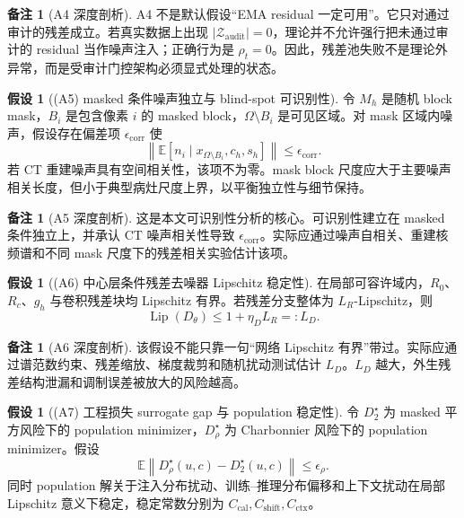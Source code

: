 \documentclass[11pt,a4paper,UTF8,fontset=fandol]{ctexart}
\theoremstyle{definition}
\newtheorem{assumption}[theorem]{假设}
\newtheorem{remark}[theorem]{备注}
\DeclareMathOperator{\Lip}{Lip}
\newcommand{\norm}[1]{\left\lVert#1\right\rVert}
\newcommand{\E}{\mathbb{E}}
\newcommand{\cZ}{\mathcal{Z}}
\begin{document}
\begin{remark}[A4 深度剖析]
A4 不是默认假设“EMA residual 一定可用”。它只对通过审计的残差成立。若真实数据上出现 $|\cZ_{\mathrm{audit}}|=0$，理论并不允许强行把未通过审计的 residual 当作噪声注入；正确行为是 $\rho_t=0$。因此，残差池失败不是理论外异常，而是受审计门控架构必须显式处理的状态。
\end{remark}

\begin{assumption}[(A5) masked 条件噪声独立与 blind-spot 可识别性]
令 $M_h$ 是随机 block mask，$B_i$ 是包含像素 $i$ 的 masked block，$\Omega\setminus B_i$ 是可见区域。对 mask 区域内噪声，假设存在偏差项 $\epsilon_{\mathrm{corr}}$ 使
\begin{equation}
\label{eq:masked-independence-coreA}
    \left\|
    \E[n_i\mid x_{\Omega\setminus B_i},c_h,s_h]
    \right\|
    \le\epsilon_{\mathrm{corr}}.
\end{equation}
若 CT 重建噪声具有空间相关性，该项不为零。mask block 尺度应大于主要噪声相关长度，但小于典型病灶尺度上界，以平衡独立性与细节保持。
\end{assumption}

\begin{remark}[A5 深度剖析]
这是本文可识别性分析的核心。可识别性建立在 masked 条件独立上，并承认 CT 噪声相关性导致 $\epsilon_{\mathrm{corr}}$。实际应通过噪声自相关、重建核频谱和不同 mask 尺度下的残差相关实验估计该项。
\end{remark}

\begin{assumption}[(A6) 中心层条件残差去噪器 Lipschitz 稳定性]
在局部可容许域内，$R_0$、$R_c$、$g_h$ 与卷积残差块均 Lipschitz 有界。若残差分支整体为 $L_R$-Lipschitz，则
\begin{equation}
\label{eq:lr-arch-bound-coreA}
    \Lip(D_\theta)\le 1+\eta_DL_R=:L_D.
\end{equation}
\end{assumption}

\begin{remark}[A6 深度剖析]
该假设不能只靠一句“网络 Lipschitz 有界”带过。实际应通过谱范数约束、残差缩放、梯度裁剪和随机扰动测试估计 $L_D$。$L_D$ 越大，外生残差结构泄漏和调制误差被放大的风险越高。
\end{remark}

\begin{assumption}[(A7) 工程损失 surrogate gap 与 population 稳定性]
令 $D_2^\star$ 为 masked 平方风险下的 population minimizer，$D_\rho^\star$ 为 Charbonnier 风险下的 population minimizer。假设
\begin{equation}
\label{eq:rho-gap-coreA}
    \E\norm{D_\rho^\star(u,c)-D_2^\star(u,c)}\le\epsilon_\rho.
\end{equation}
同时 population 解关于注入分布扰动、训练--推理分布偏移和上下文扰动在局部 Lipschitz 意义下稳定，稳定常数分别为 $C_{\mathrm{cal}},C_{\mathrm{shift}},C_{\mathrm{ctx}}$。
\end{assumption}
\end{document}
